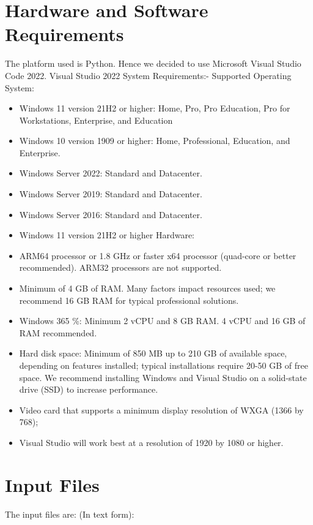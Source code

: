 \section{Hardware and Software Requirements}
The platform used is Python. Hence we decided to use Microsoft Visual Studio Code 2022.
Visual Studio 2022 System Requirements:-
Supported Operating System: \begin{itemize}
\item Windows 11 version 21H2 or higher: Home, Pro, Pro Education, Pro for Workstations, Enterprise, and Education
\item Windows 10 version 1909 or higher: Home, Professional, Education, and Enterprise.
\item Windows Server 2022: Standard and Datacenter.
\item Windows Server 2019: Standard and Datacenter.
\item Windows Server 2016: Standard and Datacenter.
\item Windows 11 version 21H2 or higher
Hardware:
\item ARM64 processor or 1.8 GHz or faster x64 processor (quad-core or better recommended). ARM32 processors are not supported.
\item Minimum of 4 GB of RAM. Many factors impact resources used; we recommend 16 GB RAM for typical professional solutions.
\item Windows 365 \%: Minimum 2 vCPU and 8 GB RAM. 4 vCPU and 16 GB of RAM recommended.
\item Hard disk space: Minimum of 850 MB up to 210 GB of available space, depending on features installed; typical installations require 20-50 GB of free space. We recommend installing Windows and Visual Studio on a solid-state drive (SSD) to increase performance.
\item Video card that supports a minimum display resolution of WXGA (1366 by 768);
\item Visual Studio will work best at a resolution of 1920 by 1080 or higher.
\end{itemize}
\newpage

\section{Input Files}
The input files are: (In text form):
